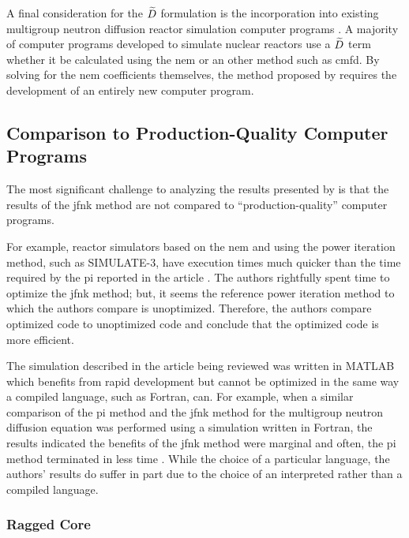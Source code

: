     A final consideration for the $\widetilde{D}$ formulation is the incorporation
    into existing multigroup neutron diffusion reactor simulation computer
    programs \cite{casmo4,simulate3,mpact}. A majority of computer programs
    developed to simulate nuclear reactors use a $\widetilde{D}$ term whether it be
    calculated using the \gls{nem} or an other method such as \gls{cmfd}. By
    solving for the \gls{nem} coefficients themselves, the method proposed by
    \citeauthor{qe2paper} requires the development of an entirely new computer
    program.

  \subsection{Comparison to Production-Quality Computer Programs}

    The most significant challenge to analyzing the results presented by
    \citeauthor{qe2paper} is that the results of the \gls{jfnk} method are not
    compared to ``production-quality'' computer programs. 
    
    For example, reactor simulators based on the \gls{nem} and using the power
    iteration method, such as SIMULATE-3, have execution times much quicker than
    the time required by the \gls{pi} reported in the article
    \cite{simulate3,qe2paper}. The authors rightfully spent time to optimize the
    \gls{jfnk} method; but, it seems the reference power iteration method to
    which the authors compare is unoptimized. Therefore, the authors compare
    optimized code to unoptimized code and conclude that the optimized code is
    more efficient.
    
    The simulation described in the article being reviewed was written in MATLAB
    which benefits from rapid development but cannot be optimized in the same
    way a compiled language, such as Fortran, can. For example, when a similar
    comparison of the \gls{pi} method and the \gls{jfnk} method for the
    multigroup neutron diffusion equation was performed using a simulation
    written in Fortran, the results indicated the benefits of the \gls{jfnk}
    method were marginal and often, the \gls{pi} method terminated in less time 
    \cite{gill_azmy}. While the choice of a particular language, the authors'
    results do suffer in part due to the choice of an interpreted rather than a
    compiled language.

    \subsubsection{Ragged Core}

